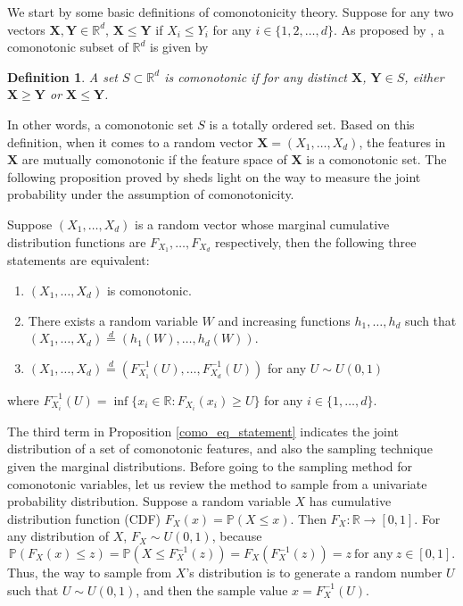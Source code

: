 \documentclass[twoside,11pt]{article}
\newtheorem{definition}{Definition}[subsection]
\begin{document}
We start by some basic definitions of comonotonicity theory. Suppose for any two vectors $\mathbf{X}, \mathbf{Y}\in \mathbb{R}^d$, $\mathbf{X}\leq\mathbf{Y}$ if $X_i\leq Y_i$ for any $i\in\{1,2,\dots,d\}$. As proposed by \citet{dhaene2006risk}, a comonotonic subset of $\mathbb{R}^d$ is given by

\begin{definition}
\label{como_def}
A set $S\subset\mathbb{R}^d$ is comonotonic if for any distinct $\mathbf{X}$, $\mathbf{Y} \in S$, either $\mathbf{X} \geq \mathbf{Y}$ or $\mathbf{X} \leq \mathbf{Y}$.
\end{definition}

In other words, a comonotonic set $S$ is a totally ordered set. Based on this definition, when it comes to a random vector $\mathbf{X}=(X_1,\dots,X_d)$, the features in $\mathbf{X}$ are mutually comonotonic if the feature space of $\mathbf{X}$ is a comonotonic set. The following proposition proved by \citet{dhaene2006risk} sheds light on the way to measure the joint probability under the assumption of comonotonicity.

\begin{proposition}
\label{como_eq_statement}
Suppose $(X_1,\dots,X_d)$ is a random vector whose marginal cumulative distribution functions are $F_{X_1},\dots,F_{X_d}$ respectively, then the following three statements are equivalent: 
\begin{enumerate}
    \item $(X_1,\dots,X_d)$ is comonotonic.
    \item There exists a random variable $W$ and increasing functions $h_1,\dots,h_d$ such that $(X_1,\dots,X_d) \stackrel{d}{=} (h_1(W),\dots,h_d(W))$.
    \item $(X_1,\dots,X_d)\stackrel{d}{=}(F_{X_1}^{-1}(U),\dots,F_{X_d}^{-1}(U))$ for any $U\sim U(0,1)$
\end{enumerate}
where $F_{X_i}^{-1}(U)=\inf\{x_i\in\mathbb{R}:F_{X_i}(x_i)\geq U\}$ for any $i\in \{1,\dots,d\}$.
\end{proposition}

The third term in Proposition \ref{como_eq_statement} indicates the joint distribution of a set of comonotonic features, and also the sampling technique given the marginal distributions. Before going to the sampling method for comonotonic variables, let us review the method to sample from a univariate probability distribution. Suppose a random variable $X$ has cumulative distribution function (CDF) $F_X(x) = \mathbb{P}(X\leq x)$. Then $F_X:\mathbb{R}\rightarrow[0,1]$. For any distribution of $X$, $F_X\sim U(0,1)$, because
\begin{equation*}
    \mathbb{P}(F_{X}(x)\leq z)=\mathbb{P}(X\leq F_{X}^{-1}(z))=F_{X}(F_{X}^{-1}(z))=z\ \text{for any}\ z\in [0,1].
\end{equation*}
Thus, the way to sample from $X$'s distribution is to generate a random number $U$ such that $U\sim U(0,1)$, and then the sample value $x=F_X^{-1}(U)$.
\end{document}
